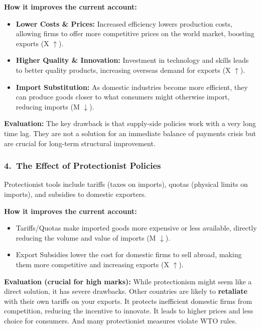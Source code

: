 \documentclass[11pt, a4paper, twoside]{book}
\begin{document}
\textbf{How it improves the current account:}
\begin{itemize}
  \item \textbf{Lower Costs \& Prices:} Increased efficiency lowers production costs, allowing firms to offer more competitive prices on the world market, boosting exports (X $\uparrow$).
  \item \textbf{Higher Quality \& Innovation:} Investment in technology and skills leads to better quality products, increasing overseas demand for exports (X $\uparrow$).
  \item \textbf{Import Substitution:} As domestic industries become more efficient, they can produce goods closer to what consumers might otherwise import, reducing imports (M $\downarrow$).
\end{itemize}

\textbf{Evaluation:} The key drawback is that supply-side policies work with a very long time lag. They are not a solution for an immediate balance of payments crisis but are crucial for long-term structural improvement.

\subsubsection{4.\ The Effect of Protectionist Policies}

Protectionist tools include tariffs (taxes on imports), quotas (physical limits on imports), and subsidies to domestic exporters.

\textbf{How it improves the current account:}
\begin{itemize}
  \item Tariffs/Quotas make imported goods more expensive or less available, directly reducing the volume and value of imports (M $\downarrow$).
  \item Export Subsidies lower the cost for domestic firms to sell abroad, making them more competitive and increasing exports (X $\uparrow$).
\end{itemize}

\begin{coreidea}
\textbf{Evaluation (crucial for high marks):} While protectionism might seem like a direct solution, it has severe drawbacks. Other countries are likely to \textbf{retaliate} with their own tariffs on your exports. It protects inefficient domestic firms from competition, reducing the incentive to innovate. It leads to higher prices and less choice for consumers. And many protectionist measures violate WTO rules.
\end{coreidea}
\end{document}
